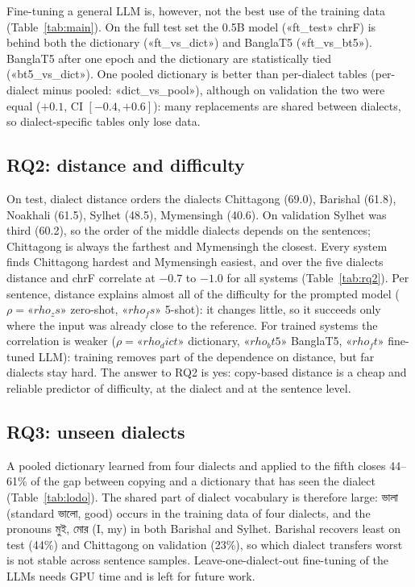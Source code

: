 \documentclass[10pt,twocolumn]{article}
\newcommand{\bn}[1]{\textbengali{#1}}
\begin{document}
Fine-tuning a general LLM is, however, not the best use of the training data (Table~\ref{tab:main}). On the
full test set the 0.5B model («ft_test» chrF) is behind both the dictionary («ft_vs_dict») and BanglaT5
(«ft_vs_bt5»). BanglaT5 after one epoch and the dictionary are statistically tied («bt5_vs_dict»). One pooled
dictionary is better than per-dialect tables (per-dialect minus pooled: «dict_vs_pool»), although on
validation the two were equal ($+0.1$, CI $[-0.4, +0.6]$): many replacements are shared between dialects, so
dialect-specific tables only lose data.



\subsection{RQ2: distance and difficulty}
On test, dialect distance orders the dialects Chittagong (69.0), Barishal (61.8), Noakhali (61.5), Sylhet
(48.5), Mymensingh (40.6). On validation Sylhet was third (60.2), so the order of the middle dialects depends
on the sentences; Chittagong is always the farthest and Mymensingh the closest. Every system finds
Chittagong hardest and Mymensingh easiest, and over the five dialects distance and chrF correlate at
$-0.7$ to $-1.0$ for all systems (Table~\ref{tab:rq2}). Per sentence, distance explains almost all of the
difficulty for the prompted model ($\rho=«rho_zs»$ zero-shot, $«rho_fs»$ 5-shot): it changes little, so it
succeeds only where the input was already close to the reference. For trained systems the correlation is
weaker ($\rho=«rho_dict»$ dictionary, $«rho_bt5»$ BanglaT5, $«rho_ft»$ fine-tuned LLM): training removes part
of the dependence on distance, but far dialects stay hard. The answer to RQ2 is yes: copy-based distance is a
cheap and reliable predictor of difficulty, at the dialect and at the sentence level.



\subsection{RQ3: unseen dialects}
A pooled dictionary learned from four dialects and applied to the fifth closes 44--61\% of the gap between
copying and a dictionary that has seen the dialect (Table~\ref{tab:lodo}). The shared part of dialect
vocabulary is therefore large: \bn{ভালা} (standard \bn{ভালো}, good) occurs in the training data of four
dialects, and the pronouns \bn{মুই}, \bn{মোর} (I, my) in both Barishal and Sylhet. Barishal recovers least on
test (44\%) and Chittagong on validation (23\%), so which dialect transfers worst is not stable across
sentence samples. Leave-one-dialect-out fine-tuning of the
LLMs needs GPU time and is left for future work.
\end{document}
